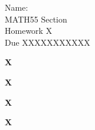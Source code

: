 \documentclass[10pt]{article}
\begin{document}
\begin{flushright}
	Name: \underline{\hspace{3cm}} \\
	MATH55 Section \underline{\hspace{0.5cm}} \\
	Homework X \\
	Due XXXXXXXXXXX
\end{flushright}

\begin{framed}
	\textbf{X}
\end{framed}

\pagebreak

\begin{framed}
	\textbf{X}
\end{framed}

\pagebreak

\begin{framed}
	\textbf{X}
\end{framed}

\pagebreak

\begin{framed}
	\textbf{X}
\end{framed}
\end{document}
